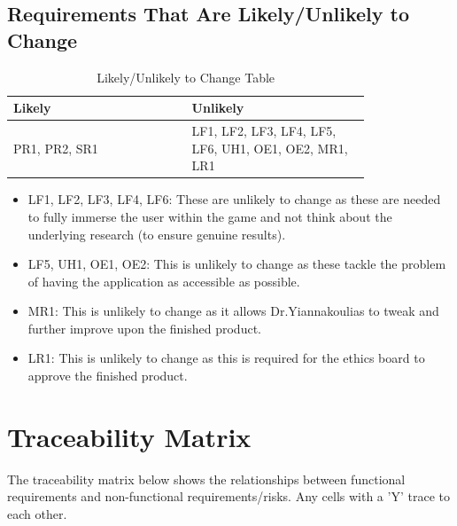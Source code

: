 \documentclass{article}
\begin{document}
\subsection{Requirements That Are Likely/Unlikely to Change}
\begin{table}[h]
    \centering
    \begin{tabular}{|p{0.40\linewidth} | p{0.40\linewidth}|}
    \hline
         Likely & Unlikely \\
         \hline
         PR1, PR2, SR1 & LF1, LF2, LF3, LF4, LF5, LF6, UH1, OE1, OE2, MR1, LR1      \\
         \hline
    \end{tabular}
    \caption{Likely/Unlikely to Change Table}
    \label{tab:my_label}
\end{table}
\begin{itemize}
    \item LF1, LF2, LF3, LF4, LF6: These are unlikely to change as these are needed to fully immerse the user within the game and not think about the underlying research (to ensure genuine results).
    \item LF5, UH1, OE1, OE2: This is unlikely to change as these tackle the problem of having the application as accessible as possible.
    \item MR1: This is unlikely to change as it allows Dr.Yiannakoulias to tweak and further improve upon the finished product.
    \item LR1: This is unlikely to change as this is required for the ethics board to approve the finished product.
    
\end{itemize}

\section{Traceability Matrix}

The traceability matrix below shows the relationships between functional requirements and non-functional requirements/risks. Any cells with a 'Y' trace to each other. 
\end{document}
